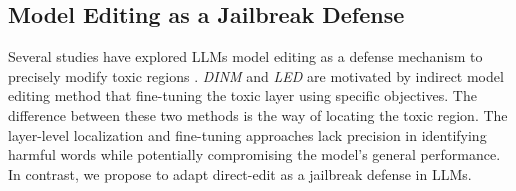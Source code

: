 \subsection{Model Editing as a Jailbreak Defense}
Several studies have explored LLMs model editing as a defense mechanism to precisely modify toxic regions \cite{wang2024detoxifying, zhao2024defending}.
\textit{DINM} \cite{wang2024detoxifying} and \textit{LED} \cite{zhao2024defending} are motivated by indirect model editing method that fine-tuning the toxic layer using specific objectives. The difference between these two methods is the way of locating the toxic region. 
The layer-level localization and fine-tuning approaches lack precision in identifying harmful words while potentially compromising the model's general performance.
In contrast, we propose to adapt direct-edit as a jailbreak defense in LLMs. 
